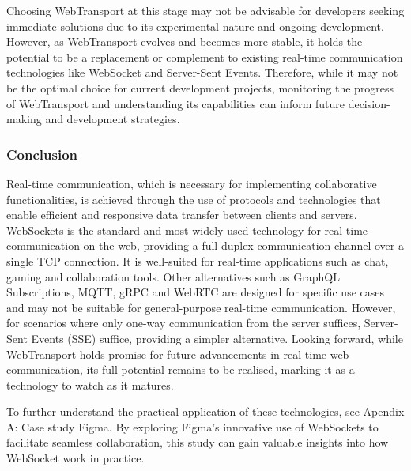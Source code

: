 Choosing WebTransport at this stage may not be advisable for developers seeking immediate solutions due to its experimental nature and ongoing development. However, as WebTransport evolves and becomes more stable, it holds the potential to be a replacement or complement to existing real-time communication technologies like WebSocket and Server-Sent Events. Therefore, while it may not be the optimal choice for current development projects, monitoring the progress of WebTransport and understanding its capabilities can inform future decision-making and development strategies.

\subsubsection{Conclusion}

Real-time communication, which is necessary for implementing collaborative functionalities, is achieved through the use of protocols and technologies that enable efficient and responsive data transfer between clients and servers. WebSockets is the standard and most widely used technology for real-time communication on the web, providing a full-duplex communication channel over a single TCP connection. It is well-suited for real-time applications such as chat, gaming and collaboration tools. Other alternatives such as GraphQL Subscriptions, MQTT, gRPC and WebRTC are designed for specific use cases and may not be suitable for general-purpose real-time communication. However, for scenarios where only one-way communication from the server suffices, Server-Sent Events (SSE) suffice, providing a simpler alternative. Looking forward, while WebTransport holds promise for future advancements in real-time web communication, its full potential remains to be realised, marking it as a technology to watch as it matures.

To further understand the practical application of these technologies, see Apendix A: Case study Figma. By exploring Figma's innovative use of WebSockets to facilitate seamless collaboration, this study can gain valuable insights into how WebSocket work in practice.
